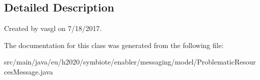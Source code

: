 \subsection{Detailed Description}
Created by vasgl on 7/18/2017. 

The documentation for this class was generated from the following file\+:\begin{DoxyCompactItemize}
\item 
src/main/java/eu/h2020/symbiote/enabler/messaging/model/Problematic\+Resources\+Message.\+java\end{DoxyCompactItemize}
